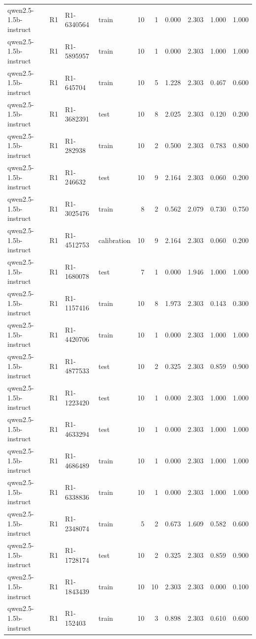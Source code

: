 \begin{table}
\begin{tabular}{llllrrrrrr}
qwen2.5-1.5b-instruct & R1 & R1-6340564 & train & 10 & 1 & 0.000 & 2.303 & 1.000 & 1.000 \\
qwen2.5-1.5b-instruct & R1 & R1-5895957 & train & 10 & 1 & 0.000 & 2.303 & 1.000 & 1.000 \\
qwen2.5-1.5b-instruct & R1 & R1-645704 & train & 10 & 5 & 1.228 & 2.303 & 0.467 & 0.600 \\
qwen2.5-1.5b-instruct & R1 & R1-3682391 & test & 10 & 8 & 2.025 & 2.303 & 0.120 & 0.200 \\
qwen2.5-1.5b-instruct & R1 & R1-282938 & train & 10 & 2 & 0.500 & 2.303 & 0.783 & 0.800 \\
qwen2.5-1.5b-instruct & R1 & R1-246632 & test & 10 & 9 & 2.164 & 2.303 & 0.060 & 0.200 \\
qwen2.5-1.5b-instruct & R1 & R1-3025476 & train & 8 & 2 & 0.562 & 2.079 & 0.730 & 0.750 \\
qwen2.5-1.5b-instruct & R1 & R1-4512753 & calibration & 10 & 9 & 2.164 & 2.303 & 0.060 & 0.200 \\
qwen2.5-1.5b-instruct & R1 & R1-1680078 & test & 7 & 1 & 0.000 & 1.946 & 1.000 & 1.000 \\
qwen2.5-1.5b-instruct & R1 & R1-1157416 & train & 10 & 8 & 1.973 & 2.303 & 0.143 & 0.300 \\
qwen2.5-1.5b-instruct & R1 & R1-4420706 & train & 10 & 1 & 0.000 & 2.303 & 1.000 & 1.000 \\
qwen2.5-1.5b-instruct & R1 & R1-4877533 & test & 10 & 2 & 0.325 & 2.303 & 0.859 & 0.900 \\
qwen2.5-1.5b-instruct & R1 & R1-1223420 & test & 10 & 1 & 0.000 & 2.303 & 1.000 & 1.000 \\
qwen2.5-1.5b-instruct & R1 & R1-4633294 & test & 10 & 1 & 0.000 & 2.303 & 1.000 & 1.000 \\
qwen2.5-1.5b-instruct & R1 & R1-4686489 & train & 10 & 1 & 0.000 & 2.303 & 1.000 & 1.000 \\
qwen2.5-1.5b-instruct & R1 & R1-6338836 & train & 10 & 1 & 0.000 & 2.303 & 1.000 & 1.000 \\
qwen2.5-1.5b-instruct & R1 & R1-2348074 & train & 5 & 2 & 0.673 & 1.609 & 0.582 & 0.600 \\
qwen2.5-1.5b-instruct & R1 & R1-1728174 & test & 10 & 2 & 0.325 & 2.303 & 0.859 & 0.900 \\
qwen2.5-1.5b-instruct & R1 & R1-1843439 & train & 10 & 10 & 2.303 & 2.303 & 0.000 & 0.100 \\
qwen2.5-1.5b-instruct & R1 & R1-152403 & train & 10 & 3 & 0.898 & 2.303 & 0.610 & 0.600 \\

\end{tabular}
\end{table}
